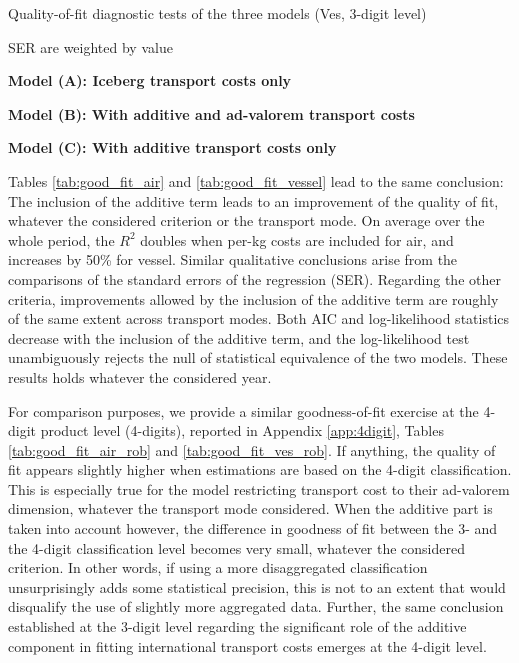 \documentclass[a4paper,11pt]{article}
\begin{document}
\begin{table}[htbp]
	\centering
	\footnotesize{
		\caption{Quality-of-fit diagnostic tests of the three models (Ves, 3-digit level)}\vspace{5mm}
		\label{tab:good_fit_vessel}%
		
		\begin{tablenotes}
			\tiny
			\item SER are weighted by value
			\item \textbf{Model (A): Iceberg transport costs only}
			\item \textbf{Model (B): With additive and ad-valorem transport costs}
			\item \textbf{Model (C): With additive transport costs only}
\end{tablenotes}
}
\end{table}%


Tables \ref{tab:good_fit_air} and \ref{tab:good_fit_vessel} lead to the same conclusion: The inclusion of the additive term leads to an improvement of the quality of fit, whatever the considered criterion or the transport mode.
On average over the whole period, the $R^{2}$ doubles when per-kg costs are included for air, and increases by 50\% for vessel.
Similar qualitative conclusions arise from the comparisons of the standard errors of the regression (SER).
Regarding the other criteria, improvements allowed by the inclusion of the additive term are roughly of the same extent across transport modes.
Both AIC and log-likelihood statistics decrease with the inclusion of the additive term, and the log-likelihood test unambiguously rejects the null of statistical equivalence of the two models.
These results holds whatever the considered year.\smallskip


For comparison purposes, we provide a similar goodness-of-fit exercise at the 4-digit product level (4-digits), reported in Appendix \ref{app:4digit}, Tables \ref{tab:good_fit_air_rob} and \ref{tab:good_fit_ves_rob}.
If anything, the quality of fit appears slightly higher when estimations are based on the 4-digit classification.
This is especially true for the model restricting transport cost to their ad-valorem dimension, whatever the transport mode considered.
When the additive part is taken into account however, the difference in goodness of fit between the 3- and the 4-digit classification level becomes very small, whatever the considered criterion.
In other words, if using a more disaggregated classification unsurprisingly adds some statistical precision, this is not to an extent that would disqualify the use of slightly more aggregated data.
Further, the same conclusion established at the 3-digit level regarding the significant role of the additive component in fitting international transport costs emerges at the 4-digit level.
\end{document}

